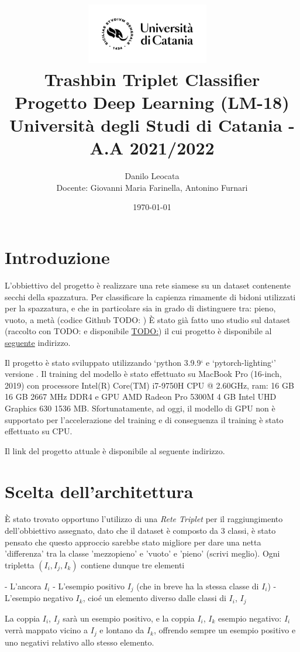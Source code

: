 \documentclass[11pt]{article}
\title{ %
\includegraphics[width=0.4\textwidth]{UniCT-Logo-Nero}~\\
Trashbin Triplet Classifier \\ 
\large Progetto Deep Learning (LM-18) \\ Università degli Studi di Catania - A.A 2021/2022 \\
}
\author{ Danilo Leocata \\ Docente: Giovanni Maria Farinella, Antonino Furnari}
\date{\today}
\begin{document}
\maketitle	
\pagebreak


\section{Introduzione}

L'obbiettivo del progetto è realizzare una rete siamese su un dataset contenente secchi della spazzatura.
Per classificare la capienza rimamente di bidoni utilizzati per la spazzatura, e che in particolare sia in grado di distinguere tra: pieno, vuoto, a metà (codice Github TODO: )
È stato già fatto uno studio sul dataset (raccolto con TODO: e disponibile \href{}{TODO:}) il cui progetto è disponibile al \href{https://github.com/khalld/trashbin-classifier}{seguente} indirizzo.

Il progetto è stato sviluppato utilizzando `python 3.9.9` e `pytorch-lighting`' versione . Il training del modello è stato effettuato su MacBook Pro (16-inch, 2019) con processore Intel(R) Core(TM) i7-9750H CPU @ 2.60GHz, ram: 16 GB 16 GB 2667 MHz DDR4 e GPU AMD Radeon Pro 5300M 4 GB
Intel UHD Graphics 630 1536 MB. Sfortunatamente, ad oggi, il modello di GPU non è supportato per l'accelerazione del training e di conseguenza il training è stato effettuato su CPU.

Il link del progetto attuale è disponibile al seguente indirizzo.


\section{Scelta dell'architettura}

È stato trovato opportuno l'utilizzo di una \textit{Rete Triplet} per il raggiungimento dell'obbiettivo assegnato, dato che il dataset è composto da 3 classi, è stato pensato che questo approccio sarebbe stato migliore per dare una netta 'differenza' tra la classe 'mezzopieno' e 'vuoto' e 'pieno' (scrivi meglio).
Ogni tripletta $(I_i, I_j, I_k)$ contiene dunque tre elementi

- L'ancora $I_i$
- L'esempio positivo $I_j$ (che in breve ha la stessa classe di $I_i$)
- L'esempio negativo $I_k$, cioé un elemento diverso dalle classi di $I_i$, $I_j$

La coppia $I_i$, $I_j$ sarà un esempio positivo, e la coppia $I_i$, $I_k$ esempio negativo: $I_i$ verrà mappato vicino a $I_j$ e lontano da $I_k$, offrendo sempre un esempio positivo e uno negativi relativo allo stesso elemento.
\end{document}
